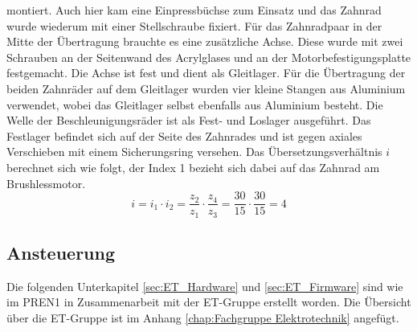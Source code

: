         montiert. Auch hier kam eine Einpressbüchse zum Einsatz und das Zahnrad wurde wiederum mit 
        einer Stellschraube fixiert. Für das Zahnradpaar in der Mitte der Übertragung brauchte es eine 
        zusätzliche Achse. Diese wurde mit zwei Schrauben an der Seitenwand des 
        Acrylglases und an der Motorbefestigungsplatte festgemacht. Die Achse ist fest und dient als 
        Gleitlager. Für die Übertragung der beiden Zahnräder auf dem Gleitlager wurden vier kleine Stangen 
        aus Aluminium verwendet, wobei das Gleitlager selbst ebenfalls aus Aluminium besteht. Die Welle der 
        Beschleunigungsräder ist als Fest- und Loslager ausgeführt. Das Festlager befindet sich auf 
        der Seite des Zahnrades und ist gegen axiales Verschieben mit einem Sicherungsring versehen. 
        Das Übersetzungsverhältnis $i$ berechnet sich wie folgt, der Index 1 bezieht sich dabei auf 
        das Zahnrad am Brushlessmotor.
        \begin{equation}
            i = i_1 \cdot i_2 = \frac{z_2}{z_1} \cdot \frac{z_4}{z_3} = \frac{30}{15} \cdot \frac{30}{15} = 4
        \end{equation}
%
\subsection{Ansteuerung}
Die folgenden Unterkapitel \ref{sec:ET_Hardware} und \ref{sec:ET_Firmware} sind wie im PREN1 
\cite{Team32:Doku} in Zusammenarbeit mit der ET-Gruppe erstellt worden. Die Übersicht über die 
ET-Gruppe ist im Anhang \ref{chap:Fachgruppe Elektrotechnik} angefügt.


